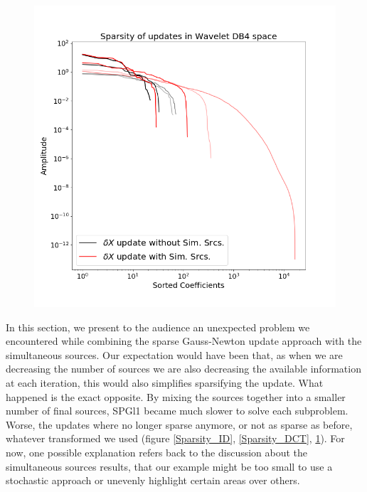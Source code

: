 \documentclass[twoside]{article}
\begin{document}
\begin{figure}[!ht]
\begin{minipage}{.31\textwidth}
  \label{Sparsity_DCT}
\end{minipage}
\begin{minipage}{0.31\textwidth}
  \centering
    \includegraphics[width=.99\linewidth]{figures/SimSrc_kills_Sparsity_WVT_DB4.png}
  \label{Sparsity_WVT4}
\end{minipage}
\end{figure}

In this section, we present to the audience an unexpected problem we encountered while combining the sparse Gauss-Newton update approach with the simultaneous sources. Our expectation would have been that, as when we are decreasing the number of sources we are also decreasing the available information at each iteration, this would also simplifies sparsifying the update. What happened is the exact opposite. By mixing the sources together into a smaller number of final sources, SPGl1 became much slower to solve each subproblem. Worse, the updates where no longer sparse anymore, or not as sparse as before, whatever transformed we used (figure \ref{Sparsity_ID}, \ref{Sparsity_DCT}, \ref{Sparsity_WVT4}).
For now, one possible explanation refers back to the discussion about the simultaneous sources results, that our example might be too small to use a stochastic approach or unevenly highlight certain areas over others.
\end{document}

